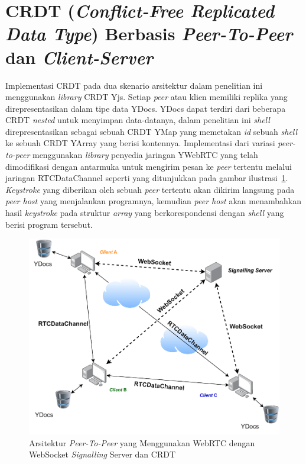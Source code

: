 \section{CRDT (\textit{Conflict-Free Replicated Data Type}) Berbasis \textit{Peer-To-Peer} dan \textit{Client-Server}}
\label{sec:desain_crdt}

Implementasi CRDT pada dua skenario arsitektur dalam penelitian ini menggunakan \textit{library} CRDT Yjs. Setiap \textit{peer} atau klien memiliki replika yang direpresentasikan dalam tipe data YDocs. YDocs dapat terdiri dari beberapa CRDT \textit{nested} untuk menyimpan data-datanya, dalam penelitian ini \textit{shell} direpresentasikan sebagai sebuah CRDT YMap yang memetakan \textit{id} sebuah \textit{shell} ke sebuah CRDT YArray yang berisi kontennya. Implementasi dari variasi \textit{peer-to-peer} menggunakan \textit{library} penyedia jaringan YWebRTC yang telah dimodifikasi dengan antarmuka untuk mengirim pesan ke \textit{peer} tertentu melalui jaringan RTCDataChannel seperti yang ditunjukkan pada gambar ilustrasi~\ref{crdt-p2p}. \textit{Keystroke} yang diberikan oleh sebuah \textit{peer} tertentu akan dikirim langsung pada \textit{peer host} yang menjalankan programnya, kemudian \textit{peer host} akan menambahkan hasil \textit{keystroke} pada struktur \textit{array} yang berkorespondensi dengan \textit{shell} yang berisi program tersebut.

\begin{figure}
    \centering
    \includegraphics[scale=0.65]{assets/skripsi/Arsitektur_WebRTC_CRDT}
    \caption{Arsitektur \textit{Peer-To-Peer} yang Menggunakan WebRTC dengan WebSocket \textit{Signalling} Server dan CRDT}
    \label{crdt-p2p}
\end{figure}

